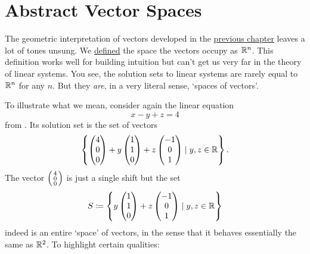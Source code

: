 \chapter{Abstract Vector Spaces}
\label{chap:abstract-vector-spaces}

The geometric interpretation of vectors developed in the
\hyperref[chap:linear-geometry]{previous chapter} leaves a lot of tones unsung.
We \hyperref[def:space]{defined} the space the vectors occupy as $\mathbb{R}^{n}$. This
definition works well for building intuition but can't get us very far in the
theory of linear systems. You see, the solution sets to linear systems are
rarely equal to $\mathbb{R}^{n}$ for any $n$. But they \emph{are}, in a very literal
sense, `spaces of vectors'.

To illustrate what we mean, consider again the linear equation
\[
 x - y + z = 4
\]
from . Its
solution set is the set of vectors
\[
 \left\{ 
  \begin{pmatrix}
   4\\
   0\\
   0
  \end{pmatrix} + y
  \begin{pmatrix}
   1\\
   1\\
   0
  \end{pmatrix} + z
  \begin{pmatrix}
   -1\\
   0\\
   1
  \end{pmatrix} \mid y,z \in \mathbb{R}
 \right\}.
\]
The vector $\begin{psmallmatrix} 4\\0\\0 \end{psmallmatrix}$ is just a single
shift but the set
\[
 S \coloneqq \left\{ 
  y\begin{pmatrix}
   1\\
   1\\
   0
  \end{pmatrix} + z
  \begin{pmatrix}
   -1\\
   0\\
   1
  \end{pmatrix} \mid y,z \in \mathbb{R}
 \right\}
\]
indeed is an entire `space' of vectors, in the sense that it behaves essentially
the same as $\mathbb{R}^2$. To highlight certain qualities:
